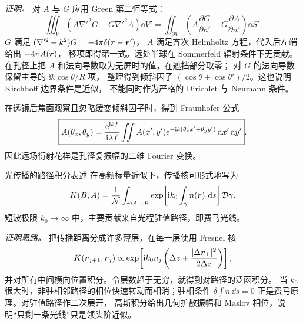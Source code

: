 \noindent\textit{证明。}
对 $A$ 与 $G$ 应用 Green 第二恒等式：
\[
 \iiint_V(A\nabla'^2G-G\nabla'^2A)\dd V'
 =\iint_{\partial V}\left(
 A\frac{\partial G}{\partial n'}
 -G\frac{\partial A}{\partial n'}\right)\dd S'.
\]
$G$ 满足 $(\nabla'^2+k^2)G=-4\pi\delta(\bm{r}-\bm{r}')$，
$A$ 满足齐次 Helmholtz 方程，代入后左端给出 $-4\pi A(\bm{r})$，
移项即得第一式。远处半球在 Sommerfeld 辐射条件下无贡献。
在孔径上把 $A$ 和法向导数取为无屏时的值，在遮挡部分取零；
对 $G$ 的法向导数保留主导的 $\ii k\cos\theta/R$ 项，
整理得到倾斜因子 $(\cos\theta+\cos\theta')/2$。这也说明 Kirchhoff 边界条件是近似，
不能同时作为严格的 Dirichlet 与 Neumann 条件。

在透镜后焦面观察且忽略缓变倾斜因子时，得到 Fraunhofer 公式
\[
 \boxed{A(\theta_x,\theta_y)=
 \frac{\mathrm e^{\mathrm i kf}}{\mathrm i\lambda f}
 \iint A(x',y')\mathrm e^{-\mathrm i k(\theta_xx'+\theta_yy')}
 \mathop{}\!\mathrm d x'\mathop{}\!\mathrm d y'}.
\]
因此远场衍射花样是孔径复振幅的二维 Fourier 变换。

\begin{advtheorem}{光传播的路径积分表述}\label{advA5:thm:path-integral}
在高频标量近似下，传播核可形式地写为
\[
 K(B,A)=\frac1{\mathcal N}\int_{\gamma:A\to B}
 \exp\!\left[\mathrm i k_0\int_\gamma n(\bm{r})\,\mathop{}\!\mathrm d s\right]
 \mathcal D\gamma .
\]
短波极限 $k_0\to\infty$ 中，主要贡献来自光程驻值路径，即费马光线。
\end{advtheorem}

\noindent\textit{证明思路。}
把传播距离分成许多薄层，在每一层使用 Fresnel 核
\[
 K(\bm{r}_{j+1},\bm{r}_j)\propto
 \exp\!\left[\mathrm i k_0n_j
 \left(\Delta z+\frac{|\Delta\bm{r}_\perp|^2}{2\Delta z}\right)\right],
\]
并对所有中间横向位置积分。令层数趋于无穷，就得到对路径的泛函积分。
当 $k_0$ 很大时，非驻相邻路径的相位快速转动而相消；驻相条件
$\delta\int n\,\dd s=0$ 正是费马原理。对驻值路径作二次展开，
高斯积分给出几何扩散振幅和 Maslov 相位，说明“只剩一条光线”只是领头阶近似。

